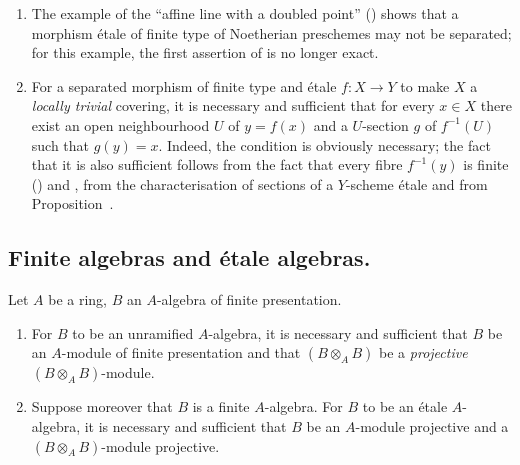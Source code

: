\begin{remarks}[18.2.10]
\label{IV.18.2.10}
\begin{enumerate}
  \item[(i)] The example of the ``affine line with a doubled point'' () shows that a morphism \'etale of finite type of Noetherian preschemes may not be separated;
for this example, the first assertion of  is no longer exact.

  \item[(ii)] For a separated morphism of finite type and \'etale $f:X\to Y$ to make $X$ a \emph{locally trivial} covering, it is necessary and sufficient that for every $x\in X$ there exist an open neighbourhood $U$ of $y=f(x)$ and a $U$-section $g$ of $f^{-1}(U)$ such that $g(y)=x$.
Indeed, the condition is obviously necessary;
the fact that it is also sufficient follows from the fact that every fibre $f^{-1}(y)$ is finite () and , from the characterisation of sections of a $Y$-scheme \'etale  and from Proposition~.
\end{enumerate}
\end{remarks}


\subsection{Finite algebras and \'etale algebras.}
\label{subsection:IV.18.3}

\begin{proposition}[18.3.1]
\label{IV.18.3.1}
Let $A$ be a ring, $B$ an $A$-algebra of finite presentation.
\begin{enumerate}
  \item[(i)] For $B$ to be an unramified $A$-algebra, it is necessary and sufficient that $B$ be an $A$-module of finite presentation and that $(B\otimes_A B)$ be a \emph{projective} $(B\otimes_A B)$-module.
  \item[(ii)] Suppose moreover that $B$ is a finite $A$-algebra. For $B$ to be an \'etale $A$-algebra, it is necessary and sufficient that $B$ be an $A$-module projective and a $(B\otimes_A B)$-module projective.
\end{enumerate}
\end{proposition}

